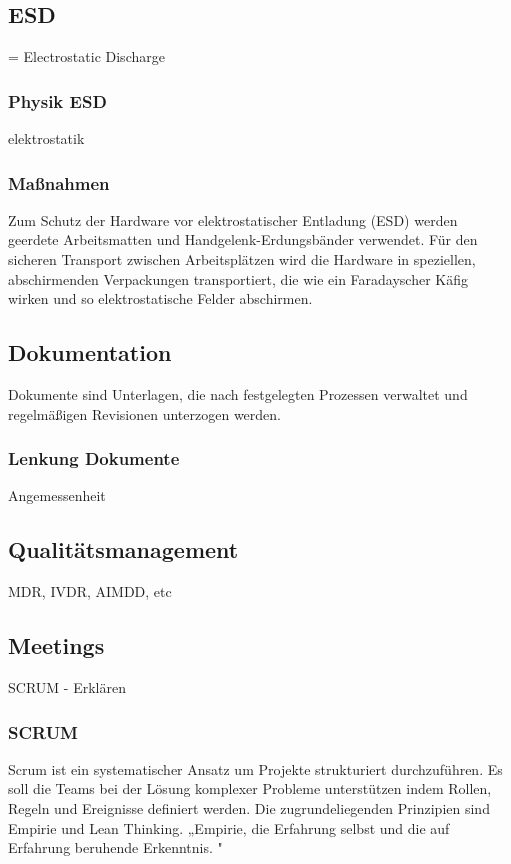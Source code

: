 \documentclass[a4paper, 12pt]{article}
\begin{document}
\subsection{ESD}\label{ESD}
= Electrostatic Discharge

\subsubsection{Physik ESD}\label{physik_esd}
elektrostatik

\subsubsection{Maßnahmen}\label{measurements_esd}
Zum Schutz der Hardware vor elektrostatischer Entladung (ESD) werden geerdete Arbeitsmatten und Handgelenk-Erdungsbänder verwendet. Für den sicheren Transport zwischen Arbeitsplätzen wird die Hardware in speziellen, abschirmenden Verpackungen transportiert, die wie ein Faradayscher Käfig wirken und so elektrostatische Felder abschirmen.

\subsection{Dokumentation}\label{Dokumentation}
Dokumente sind Unterlagen, die nach festgelegten Prozessen verwaltet und regelmäßigen Revisionen unterzogen werden. \\
\subsubsection{Lenkung Dokumente}\label{lenkung_dokumente}
Angemessenheit

\subsection{Qualitätsmanagement}\label{Qualitätsmanagement}
MDR, IVDR, AIMDD, etc


\subsection{Meetings}\label{Meetings}
SCRUM - Erklären

\subsubsection{SCRUM}\label{SCRUM}
Scrum ist ein systematischer Ansatz um Projekte strukturiert durchzuführen. Es soll die Teams bei der Lösung komplexer Probleme unterstützen indem Rollen, Regeln und Ereignisse definiert werden. Die zugrundeliegenden Prinzipien sind Empirie und Lean Thinking. 
„Empirie, die Erfahrung selbst und die auf Erfahrung beruhende Erkenntnis.  
 \cite{dorsch_empirie}"
 
\end{document}
